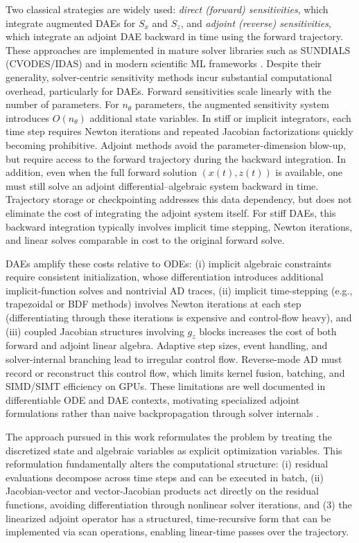 Two classical strategies are widely used: \textit{direct (forward) sensitivities}, which integrate augmented DAEs for $S_{ x}$ and $S_{ z}$, and \textit{adjoint (reverse) sensitivities}, which integrate an adjoint DAE backward in time using the forward trajectory. These approaches are implemented in mature solver libraries such as SUNDIALS (CVODES/IDAS) \cite{hindmarsh2005sundials,cvodes_adj,idas_adj} and in modern scientific ML frameworks \cite{scimlsensitivity}. Despite their generality, solver-centric sensitivity methods incur substantial computational overhead, particularly for DAEs. Forward sensitivities scale linearly with the number of parameters. For $n_\theta$ parameters, the augmented sensitivity system introduces $O(n_\theta)$ additional state variables. In stiff or implicit integrators, each time step requires Newton iterations and repeated Jacobian factorizations quickly becoming prohibitive. Adjoint methods avoid the parameter-dimension blow-up, but require access to the forward trajectory during the backward integration. In addition, even when the full forward solution $({x}(t),{z}(t))$ is available, one must still solve an adjoint differential--algebraic system backward in time. Trajectory storage or checkpointing addresses this data dependency, but does not eliminate the cost of integrating the adjoint system itself. For stiff DAEs, this backward integration typically involves implicit time stepping, Newton iterations, and linear solves comparable in cost to the original forward solve.

DAEs amplify these costs relative to ODEs: (i) implicit algebraic constraints require consistent initialization, whose differentiation introduces additional implicit-function solves and nontrivial AD traces, (ii) implicit time-stepping (e.g., trapezoidal or BDF methods) involves Newton iterations at each step (differentiating through these iterations is expensive and control-flow heavy), and (iii) coupled Jacobian structures involving $g_z$ blocks increases the cost of both forward and adjoint linear algebra. Adaptive step sizes, event handling, and solver-internal branching lead to irregular control flow. Reverse-mode AD must record or reconstruct this control flow, which limits kernel fusion, batching, and SIMD/SIMT efficiency on GPUs. These limitations are well documented in differentiable ODE and DAE contexts, motivating specialized adjoint formulations rather than naive backpropagation through solver internals \cite{torchdiffeq,chen2018neuralode}.

The approach pursued in this work reformulates the problem by treating the discretized state and algebraic variables as explicit optimization variables. This reformulation fundamentally alters the computational structure: (i) residual evaluations decompose across time steps and can be executed in batch, (ii) Jacobian-vector and vector-Jacobian products act directly on the residual functions, avoiding differentiation through nonlinear solver iterations, and (3) the linearized adjoint operator has a structured, time-recursive form that can be implemented via scan operations, enabling linear-time passes over the trajectory.

